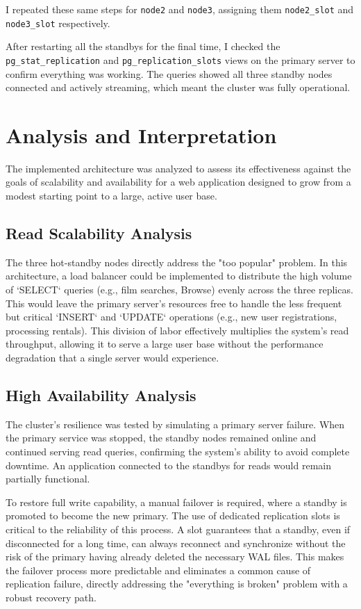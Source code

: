 \documentclass[conference]{IEEEtran}
\begin{document}
I repeated these same steps for \texttt{node2} and \texttt{node3}, assigning them \texttt{node2\_slot} and \texttt{node3\_slot} respectively.

After restarting all the standbys for the final time, I checked the \texttt{pg\_stat\_replication} and \texttt{pg\_replication\_slots} views on the primary server to confirm everything was working. The queries showed all three standby nodes connected and actively streaming, which meant the cluster was fully operational.


\section{Analysis and Interpretation}
The implemented architecture was analyzed to assess its effectiveness against the goals of scalability and availability for a web application designed to grow from a modest starting point to a large, active user base.

\subsection{Read Scalability Analysis}
The three hot-standby nodes directly address the "too popular" problem. In this architecture, a load balancer could be implemented to distribute the high volume of `SELECT` queries (e.g., film searches, Browse) evenly across the three replicas. This would leave the primary server's resources free to handle the less frequent but critical `INSERT` and `UPDATE` operations (e.g., new user registrations, processing rentals). This division of labor effectively multiplies the system's read throughput, allowing it to serve a large user base without the performance degradation that a single server would experience.

\subsection{High Availability Analysis}
The cluster's resilience was tested by simulating a primary server failure. When the primary service was stopped, the standby nodes remained online and continued serving read queries, confirming the system's ability to avoid complete downtime. An application connected to the standbys for reads would remain partially functional.

To restore full write capability, a manual failover is required, where a standby is promoted to become the new primary. The use of dedicated replication slots is critical to the reliability of this process. A slot guarantees that a standby, even if disconnected for a long time, can always reconnect and synchronize without the risk of the primary having already deleted the necessary WAL files. This makes the failover process more predictable and eliminates a common cause of replication failure, directly addressing the "everything is broken" problem with a robust recovery path.
\end{document}
